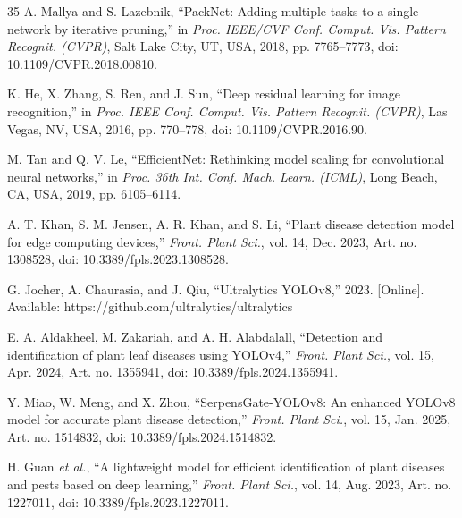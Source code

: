 \documentclass[journal]{IEEEtran}
\begin{document}
\begin{thebibliography}{35}
A. Mallya and S. Lazebnik, ``PackNet: Adding multiple tasks to a single network by
iterative pruning,'' in \emph{Proc. IEEE/CVF Conf. Comput. Vis. Pattern Recognit.
(CVPR)}, Salt Lake City, UT, USA, 2018, pp. 7765--7773,
doi: 10.1109/CVPR.2018.00810.

K. He, X. Zhang, S. Ren, and J. Sun, ``Deep residual learning for image recognition,''
in \emph{Proc. IEEE Conf. Comput. Vis. Pattern Recognit. (CVPR)}, Las Vegas, NV, USA,
2016, pp. 770--778, doi: 10.1109/CVPR.2016.90.

M. Tan and Q. V. Le, ``EfficientNet: Rethinking model scaling for convolutional neural
networks,'' in \emph{Proc. 36th Int. Conf. Mach. Learn. (ICML)}, Long Beach, CA, USA,
2019, pp. 6105--6114.


A. T. Khan, S. M. Jensen, A. R. Khan, and S. Li, ``Plant disease detection model
for edge computing devices,'' \emph{Front. Plant Sci.}, vol. 14, Dec. 2023,
Art. no. 1308528, doi: 10.3389/fpls.2023.1308528.

G. Jocher, A. Chaurasia, and J. Qiu, ``Ultralytics YOLOv8,'' 2023. [Online].
Available: https://github.com/ultralytics/ultralytics

E. A. Aldakheel, M. Zakariah, and A. H. Alabdalall, ``Detection and identification of
plant leaf diseases using YOLOv4,'' \emph{Front. Plant Sci.}, vol. 15, Apr. 2024,
Art. no. 1355941, doi: 10.3389/fpls.2024.1355941.

Y. Miao, W. Meng, and X. Zhou, ``SerpensGate-YOLOv8: An enhanced YOLOv8 model for
accurate plant disease detection,'' \emph{Front. Plant Sci.}, vol. 15, Jan. 2025,
Art. no. 1514832, doi: 10.3389/fpls.2024.1514832.

H. Guan \emph{et al.}, ``A lightweight model for efficient identification of plant
diseases and pests based on deep learning,'' \emph{Front. Plant Sci.}, vol. 14,
Aug. 2023, Art. no. 1227011, doi: 10.3389/fpls.2023.1227011.


\end{thebibliography}
\end{document}
